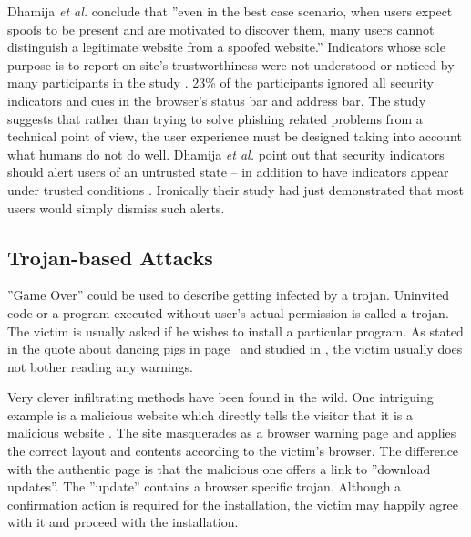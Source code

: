 \documentclass[english,gradu]{tktltiki}
\begin{document}
              Dhamija \emph{et al.} conclude \cite{why_phishing_works_06} that ''even in the best case scenario, when users expect spoofs to be present and are motivated to discover them, many users cannot distinguish a legitimate website from a spoofed website.'' Indicators whose sole purpose is to report on site's trustworthiness were not understood or noticed by many participants in the study \cite{why_phishing_works_06}. 23\% of the participants ignored all security indicators and cues in the browser's status bar and address bar. The study suggests that rather than trying to solve phishing related problems from a technical point of view, the user experience must be designed taking into account what humans do not do well. Dhamija \emph{et al.} point out that security indicators should alert users of an untrusted state -- in addition to have indicators appear under trusted conditions \cite{why_phishing_works_06}. Ironically their study had just demonstrated that most users would simply dismiss such alerts.



          \subsection{Trojan-based Attacks}
            \label{sec:trojans}

            ''Game Over'' could be used to describe getting infected by a trojan. Uninvited code or a program executed without user's actual permission is called a trojan. The victim is usually asked if he wishes to install a particular program. As stated in the quote about dancing pigs in page~\pageref{quote:dancing_pigs} and studied in \cite{why_phishing_works_06}, the victim usually does not bother reading any warnings.

              Very clever infiltrating methods have been found in the wild. One intriguing example is a malicious website which directly tells the visitor that it is a malicious website \cite{fsecure_webtrojan_2010}. The site masquerades as a browser warning page and applies the correct layout and contents according to the victim's browser. The difference with the authentic page is that the malicious one offers a link to ''download updates''. The ''update'' contains a browser specific trojan. Although a confirmation action is required for the installation, the victim may happily agree with it and proceed with the installation.
\end{document}
